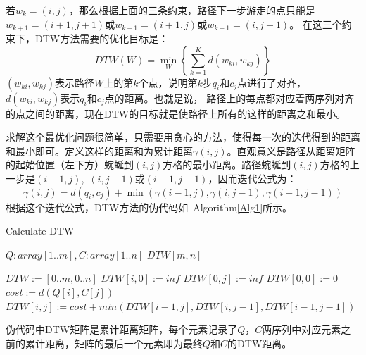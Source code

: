 若$w_k=(i,j)$，那么根据上面的三条约束，路径下一步游走的点只能是$w_{k+1}=(i+1,j+1)$或$w_{k+1}=(i+1,j)$或$w_{k+1}=(i,j+1)$。
在这三个约束下，DTW方法需要的优化目标是：
\begin{equation}\label{equ:3}
    DTW(W) = \mathop {\min }\limits_W \left\{ {\sum\limits_{k = 1}^K {d\left( {{w_{ki}},{w_{kj}}} \right)} } \right\}
\end{equation}
$\left( w_{ki},w_{kj} \right)$表示路径$W$上的第$k$个点，说明第$k$步$q_i$和$c_j$点进行了对齐，${d\left( {{w_{ki}},{w_{kj}}} \right)}$表示$q_i$和$c_j$点的距离。也就是说， 路径上的每点都对应着两序列对齐的点之间的距离，现在DTW的目标就是使路径上所有的这样的距离之和最小。

求解这个最优化问题很简单，只需要用贪心的方法，使得每一次的迭代得到的距离和最小即可。定义这样的距离和为累计距离$\gamma(i,j)$。直观意义是路径从距离矩阵的起始位置（左下方）蜿蜒到$(i,j)$方格的最小距离。路径蜿蜒到$(i,j)$方格的上一步是$(i-1,j)$,\ $(i,j-1)$或$(i-1,j-1)$，因而迭代公式为：
\begin{equation}\label{equ:4}
  \gamma(i,j)=d(q_i,c_j)+\min \left( {\gamma \left( {i - 1,j} \right),\gamma \left( {i,j - 1} \right),\gamma \left( {i - 1,j - 1} \right)} \right)
\end{equation}
根据这个迭代公式，DTW方法的伪代码如\ Algorithm\ref{Alg1}所示。

\begin{algorithm}[h]
\caption{Calculate DTW}
\begin{algorithmic}[1]
\small
\REQUIRE $Q:array[1..m], C:array[1..n]$
\ENSURE $DTW[m,n]$

\STATE $DTW := [0..m,0..n]$
\STATE $DTW[i,0] := inf$
\ENDFOR
{}
\STATE $DTW[0,j] := inf$
\ENDFOR
\STATE $DTW[0,0] := 0$
\STATE
{}
\STATE $cost:=d(Q[i],C[j])$
\STATE $DTW[i,j]:=cost+min(DTW[i-1,j],DTW[i,j-1],DTW[i-1,j-1])$
\ENDFOR
\ENDFOR
\end{algorithmic}
\label{Alg1}
\end{algorithm}

伪代码中DTW矩阵是累计距离矩阵，每个元素记录了$Q$，$C$两序列中对应元素之前的累计距离，矩阵的最后一个元素即为最终$Q$和$C$的DTW距离。

